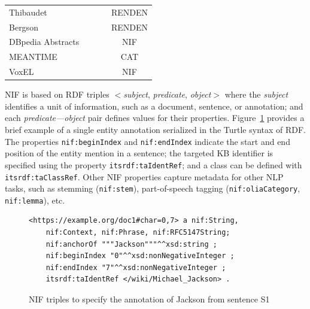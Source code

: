\documentclass[sigconf]{acmart}
\newcommand{\cmark}{\ding{51}}%
\newcommand{\xmark}{\ding{55}}%
\begin{document}
\begin{table}[tb!]
\begin{tabular}{lccc}
Thibaudet~\cite{renden2016}         &\xmark &\cmark & RENDEN  \\ %
Bergson~\cite{renden2016}           &\xmark &\cmark & RENDEN  \\ %
DBpedia Abstracts
~\cite{abstracts2016}               &\xmark &\xmark & NIF \\ %
MEANTIME~\cite{meantime2016}        &\cmark &\cmark & CAT \\ %
VoxEL~\cite{VoxEL2018}              &\cmark &\xmark & NIF \\%
\bottomrule
\end{tabular}
\end{table}


NIF is based on RDF triples $<$\textit{subject}, \textit{predicate}, \textit{object}$>$ where the \textit{subject} identifies a unit of information, such as a document, sentence, or annotation; and each \textit{predicate---object} pair defines values for their properties. Figure~\ref{fig:nif} provides a brief example of a single entity annotation serialized in the Turtle syntax of RDF. The properties \texttt{nif:beginIndex} and \texttt{nif:endIndex} indicate the start and end position of the entity mention in a sentence; the targeted KB identifier is specified using the property \texttt{itsrdf:taIdentRef}; and a class can be defined with \texttt{itsrdf:taClassRef}. Other NIF properties capture metadata for other NLP tasks, such as stemming (\texttt{nif:stem}), part-of-speech tagging (\texttt{nif:oliaCategory}, \texttt{nif:lemma}), etc.


\begin{figure}
\caption{NIF triples to specify the annotation of Jackson from sentence S1}
\label{fig:nif}
\begin{Verbatim}[frame=single]
<https://example.org/doc1#char=0,7> a nif:String,
    nif:Context, nif:Phrase, nif:RFC5147String;
    nif:anchorOf """Jackson"""^^xsd:string ;
    nif:beginIndex "0"^^xsd:nonNegativeInteger ;
    nif:endIndex "7"^^xsd:nonNegativeInteger ;
    itsrdf:taIdentRef </wiki/Michael_Jackson> .
\end{Verbatim}
\end{figure}

\end{document}
